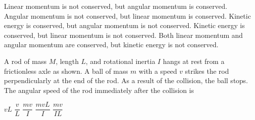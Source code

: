\documentclass{../../../oss-apphys-exam}
\begin{document}
\begin{questions}
\begin{center}
  \end{center}
  \begin{choices}
    \choice Linear momentum is not conserved, but angular momentum is conserved.
    \choice Angular momentum is not conserved, but linear momentum is conserved.
    \choice Kinetic energy is conserved, but angular momentum is not
    conserved.
    \choice Kinetic energy is conserved, but linear momentum is not conserved.
    \choice Both linear momentum and angular momentum are conserved, but
    kinetic energy is not conserved.
  \end{choices}
  \newpage
  
  \question A rod of mass $M$, length $L$, and rotational inertia $I$ hangs
  at rest from a frictionless axle as shown. A ball of mass $m$ with a speed
  $v$ strikes the rod perpendicularly at the end of the rod. As a result
  of the collision, the ball stops. The angular speed of the rod immediately
  after the collision is
  \begin{center}
  \end{center}
  \begin{choices}
    \choice $vL$
    \choice $\dfrac vL$
    \choice $\dfrac{mv}I$
    \choice $\dfrac{mv L}I$
    \choice $\dfrac{mv}{IL}$
  \end{choices}
    

\end{questions}
\end{document}
